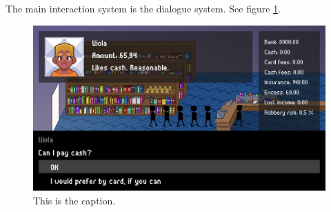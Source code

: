 \documentclass[a4paper,11pt]{article}
\begin{document}
The main interaction system is the dialogue system. See figure \ref{fig:uisketch}.

\begin{figure}[h]
\centering
\includegraphics[width=\textwidth]{ui_sketch.jpg}
\caption{This is the caption.}\label{fig:uisketch}
\end{figure}
\end{document}
